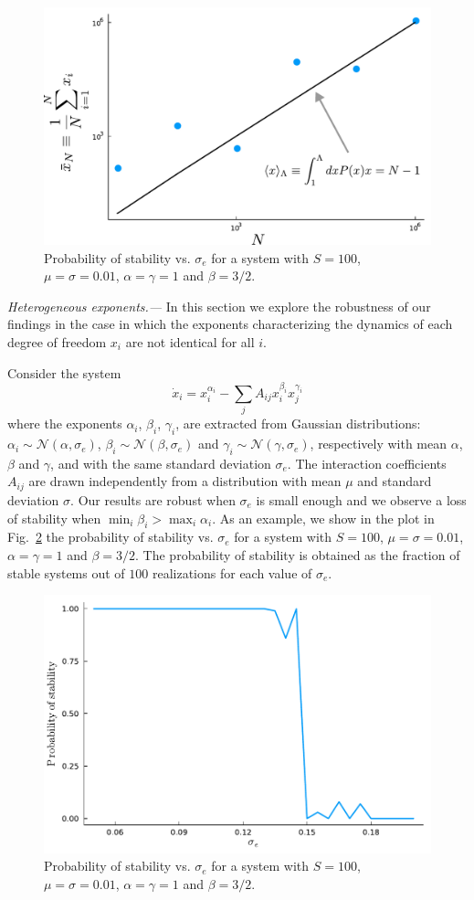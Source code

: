 \documentclass[aps,prl,superscriptaddress,twocolumn]{revtex4}
\begin{document}
\begin{figure}[h!]
  \includegraphics[width=.475\textwidth]{cut-off-justification.pdf}
  \caption{Probability of stability vs. $\sigma_e$ for a system with $S=100$, $\mu=\sigma=0.01$, $\alpha=\gamma=1$ and $\beta=3/2$.
  }
  \label{fig: SM-cut-off}
\end{figure}

{\it Heterogeneous exponents.---} In this section we explore the robustness of our findings in the case in which the exponents characterizing the dynamics of each degree of freedom $x_i$ are not identical for all $i$.

Consider the system
\begin{equation}
  \dot{x}_i = x_i^{\alpha_i} - \sum_jA_{ij}x_i^{\beta_i}x_j^{\gamma_i}
\end{equation}
where the exponents $\alpha_i$, $\beta_i$, $\gamma_i$, are extracted from Gaussian distributions: $\alpha_i\sim\mathcal N(\alpha,\sigma_e)$, $\beta_i\sim\mathcal N(\beta,\sigma_e)$ and $\gamma_i\sim\mathcal N(\gamma,\sigma_e)$, respectively with mean $\alpha$, $\beta$ and $\gamma$, and with the same standard deviation $\sigma_e$. The interaction coefficients $A_{ij}$ are drawn independently from a distribution with mean $\mu$ and standard deviation $\sigma$.
Our results are robust when $\sigma_e$ is small enough and we observe a loss of stability when $\min_i\beta_i>\max_i\alpha_i$.
As an example, we show in the plot in Fig.~\ref{fig: SM-het-exp} the probability of stability vs. $\sigma_e$ for a system with $S=100$, $\mu=\sigma=0.01$, $\alpha=\gamma=1$ and $\beta=3/2$.
The probability of stability is obtained as the fraction of stable systems out of $100$ realizations for each value of $\sigma_e$.

\begin{figure}[h!]
  \includegraphics[width=.475\textwidth]{stoch-exp.pdf}
  \caption{Probability of stability vs. $\sigma_e$ for a system with $S=100$, $\mu=\sigma=0.01$, $\alpha=\gamma=1$ and $\beta=3/2$.
  }
  \label{fig: SM-het-exp}
\end{figure}
\end{document}
